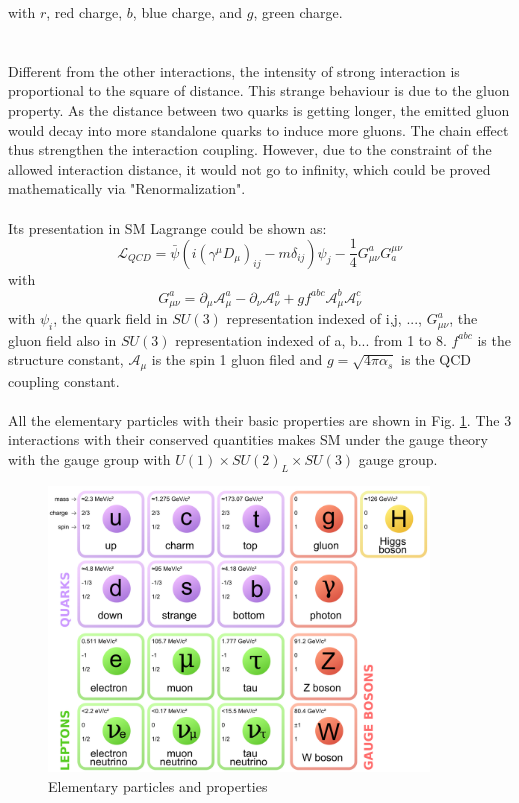 with $r$, red charge, $b$, blue charge, and $g$, green charge.\\
\\
\\Different from the other interactions, the intensity of strong interaction is proportional to the square of distance. This strange behaviour is due to the gluon property. As the distance between two quarks is getting longer, the emitted gluon would decay into more standalone quarks to induce more gluons. The chain effect thus strengthen the interaction coupling. However, due to the constraint of the allowed interaction distance, it would not go to infinity, which could be proved mathematically via "Renormalization".
\\
\\Its presentation in SM Lagrange could be shown as:
\begin{equation}
\mathcal{L}_{QCD}=\bar{\psi}(i(\gamma^\mu D_\mu)_{ij}-m\delta_{ij})\psi_j-\frac{1}{4}G^a_{\mu\nu}G_a^{\mu\nu} 
\end{equation}
with
\begin{equation}
G^a_{\mu\nu}=\partial_\mu\mathcal{A}^a_\mu-\partial_\nu\mathcal{A}^a_\nu+gf^{abc}\mathcal{A}^b_\mu\mathcal{A}^c_\nu 
\end{equation}
with $\psi_i$, the quark field in $SU(3)$ representation indexed of i,j, ..., $G^a_{\mu\nu}$, the gluon field also in $SU(3)$ representation indexed of a, b... from 1 to 8. $f^{abc}$ is the structure constant, $\mathcal{A}_\mu$ is the spin 1 gluon filed and $g = \sqrt{4\pi\alpha_s}$ is the QCD coupling constant.
\\
\\All the elementary particles with their basic properties are shown in Fig. \ref{Fig:elementary_particle}. The 3 interactions with their conserved quantities makes SM under the gauge theory with the gauge group with $U(1) \times SU(2)_L \times SU(3)$ gauge group.

\begin{figure}[!h]                
	\includegraphics[width=0.9\textwidth]{Chapter1/elementary_particle.png}
	\centering
	\begin{center}
		\caption{Elementary particles and properties}
		\label{Fig:elementary_particle}            
	\end{center}
\end{figure}


